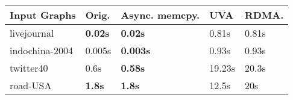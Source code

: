 \begin{table}[!tb]
  \small
  \centering
  \begin{tabular}{@{}p{60pt}p{35pt}p{35pt}p{35pt}p{35pt}@{}}
    \toprule[1.2pt]
    Input Graphs   & Orig.   & Async. memcpy. & UVA & RDMA. \\
    \midrule
    livejournal    &  \textbf{0.02s}  & \textbf{0.02s}      & 0.81s   & 0.81s \\
    indochina-2004 &  0.005s & \textbf{0.003s}     & 0.93s   & 0.93s\\
    twitter40      &  0.6s   & \textbf{0.58s}      & 19.23s  & 20.3s\\
    road-USA       &  \textbf{1.8s}   & \textbf{1.8s}       & 12.5s   & 20s  \\
    \bottomrule[1.2pt]
  \end{tabular}
  \vspace{5pt} 
  \label{tbl-op}
  \vspace{-15pt}
\end{table}
